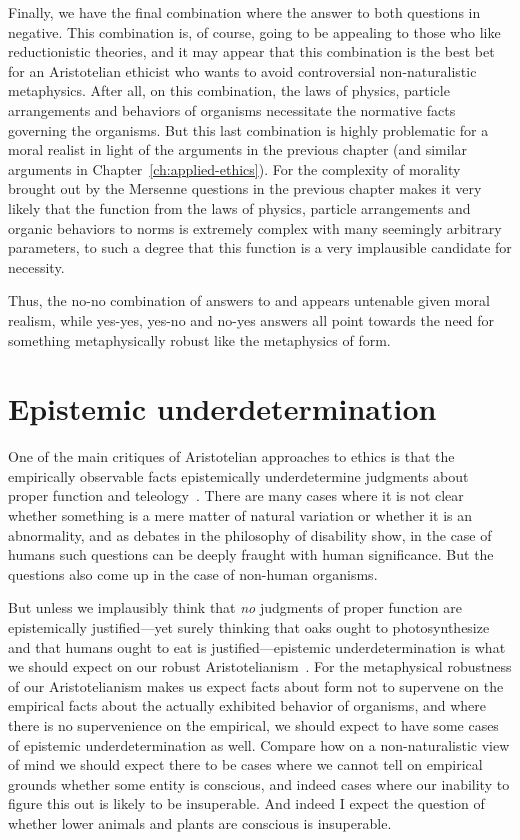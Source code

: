 Finally, we have the final combination where the answer to both questions in negative. This combination is, of course,
going to be appealing to those who like reductionistic theories, and it may appear that this combination is the
best bet for an Aristotelian ethicist who wants to avoid controversial non-naturalistic metaphysics. After all,
on this combination, the laws of physics, particle arrangements and behaviors of organisms necessitate the normative
facts governing the organisms. But this last combination is highly problematic for a moral realist in light of
the arguments in the previous chapter (and similar arguments in Chapter~\ref{ch:applied-ethics}). For the complexity of
morality brought out by the Mersenne questions in the previous chapter makes it very likely that the function from
the laws of physics, particle arrangements and organic behaviors to norms is extremely complex with many seemingly
arbitrary parameters, to such a degree that this function is a very implausible candidate for necessity.

Thus, the no-no combination of answers to  and  appears untenable given moral realism,
while yes-yes, yes-no and no-yes answers all point towards the need for something metaphysically robust like
the metaphysics of form.

\section{Epistemic underdetermination}
One of the main critiques of Aristotelian approaches to ethics is that the empirically observable facts 
epistemically underdetermine judgments about proper function and teleology~. 
There are many cases where it is not clear whether something is a mere matter of natural variation
or whether it is an abnormality, and as debates in the philosophy of disability show, in the case
of humans such questions can be deeply fraught with human significance. But the questions also come
up in the case of non-human organisms. 

But unless we implausibly think that \textit{no} judgments of proper function are epistemically justified---yet surely 
thinking that oaks ought to photosynthesize and that humans ought to eat is justified---epistemic
underdetermination is what we should expect on our robust Aristotelianism~.
For the metaphysical
robustness of our Aristotelianism makes us expect facts about form not to supervene on the
empirical facts about the actually exhibited behavior of organisms, and where there is no supervenience on the
empirical, we should expect to have some cases of epistemic underdetermination as well. Compare how on a 
non-naturalistic view of mind we should expect there to be cases where we cannot tell on empirical grounds
whether some entity is conscious, and indeed cases where our inability to figure this out is likely to be
insuperable. And indeed I expect the question of whether lower animals and plants are conscious is insuperable.

